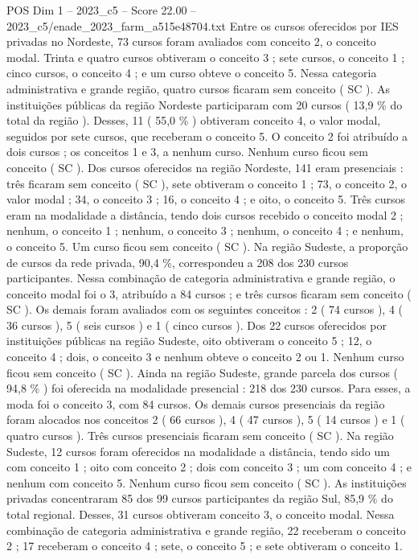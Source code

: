 \begin{textsample}{POS Dim 1 – 2023\_c5 – Score 22.00 – 2023\_c5/enade\_2023\_farm\_a515e48704.txt}
Entre os cursos oferecidos por IES privadas no Nordeste, 73 cursos foram avaliados com conceito 2, o conceito modal.
Trinta e quatro cursos obtiveram o conceito 3 ; sete cursos, o conceito 1 ; cinco cursos, o conceito 4 ; e um curso obteve o conceito 5.
Nessa categoria administrativa e grande região, quatro cursos ficaram sem conceito ( SC ).
As instituições públicas da região Nordeste participaram com 20 cursos ( 13,9 \% do total da região ).
Desses, 11 ( 55,0 \% ) obtiveram conceito 4, o valor modal, seguidos por sete cursos, que receberam o conceito 5.
O conceito 2 foi atribuído a dois cursos ; os conceitos 1 e 3, a nenhum curso.
Nenhum curso ficou sem conceito ( SC ).
Dos cursos oferecidos na região Nordeste, 141 eram presenciais : três ficaram sem conceito ( SC ), sete obtiveram o conceito 1 ; 73, o conceito 2, o valor modal ; 34, o conceito 3 ; 16, o conceito 4 ; e oito, o conceito 5.
Três cursos eram na modalidade a distância, tendo dois cursos recebido o conceito modal 2 ; nenhum, o conceito 1 ; nenhum, o conceito 3 ; nenhum, o conceito 4 ; e nenhum, o conceito 5.
Um curso ficou sem conceito ( SC ).
Na região Sudeste, a proporção de cursos da rede privada, 90,4 \%, correspondeu a 208 dos 230 cursos participantes.
Nessa combinação de categoria administrativa e grande região, o conceito modal foi o 3, atribuído a 84 cursos ; e três cursos ficaram sem conceito ( SC ).
Os demais foram avaliados com os seguintes conceitos : 2 ( 74 cursos ), 4 ( 36 cursos ), 5 ( seis cursos ) e 1 ( cinco cursos ).
Dos 22 cursos oferecidos por instituições públicas na região Sudeste, oito obtiveram o conceito 5 ; 12, o conceito 4 ; dois, o conceito 3 e nenhum obteve o conceito 2 ou 1.
Nenhum curso ficou sem conceito ( SC ).
Ainda na região Sudeste, grande parcela dos cursos ( 94,8 \% ) foi oferecida na modalidade presencial : 218 dos 230 cursos.
Para esses, a moda foi o conceito 3, com 84 cursos.
Os demais cursos presenciais da região foram alocados nos conceitos 2 ( 66 cursos ), 4 ( 47 cursos ), 5 ( 14 cursos ) e 1 ( quatro cursos ).
Três cursos presenciais ficaram sem conceito ( SC ).
Na região Sudeste, 12 cursos foram oferecidos na modalidade a distância, tendo sido um com conceito 1 ; oito com conceito 2 ; dois com conceito 3 ; um com conceito 4 ; e nenhum com conceito 5.
Nenhum curso ficou sem conceito ( SC ).
As instituições privadas concentraram 85 dos 99 cursos participantes da região Sul, 85,9 \% do total regional.
Desses, 31 cursos obtiveram conceito 3, o conceito modal.
Nessa combinação de categoria administrativa e grande região, 22 receberam o conceito 2 ; 17 receberam o conceito 4 ; sete, o conceito 5 ; e sete obtiveram o conceito 1.

\end{textsample}
